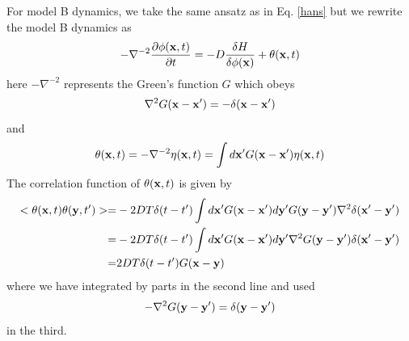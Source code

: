 For model B dynamics, we take the same ansatz as in Eq. \eqref{hans} but we rewrite the model B dynamics as
\begin{equation}
-\nabla^{-2} \frac{\partial\phi({\bf x},t)}{\partial t} = -D \frac{\delta H}{\delta \phi({\bf x})}+ \theta({\bf x},t)
\end{equation}
here $-\nabla^{-2}$ represents the Green's function $G$ which obeys 
\begin{equation}
\nabla^2 G({\bf x}-{\bf x'}) = -\delta({\bf x}-{\bf x}')
\end{equation}
and 
\begin{equation}
\theta({\bf x},t)=-\nabla^{-2}\eta({\bf x},t)= \int d{\bf x}'G({\bf x}-{\bf x'})\eta({\bf x},t)
\end{equation}
The correlation function of $\theta({\bf x},t)$ is given by
\begin{align}
< \theta({\bf x},t)\theta({\bf y},t')> =&-2DT\delta(t-t') \int d{\bf x}'G({\bf x}-{\bf x'})d{\bf y}'G({\bf y}-{\bf y'})\nabla^2\delta({\bf x}'-{\bf y}') \nonumber \\
=& -2DT\delta(t-t') \int d{\bf x}'G({\bf x}-{\bf x'})d{\bf y}'\nabla^2G({\bf y}-{\bf y'})\delta({\bf x}'-{\bf y}') \nonumber \\
=& 2DT\delta(t-t') G({\bf x}-{\bf y})
\end{align}
where we have integrated by parts in the second line and used 
\begin{equation}
-\nabla^2G({\bf y}-{\bf y'})= \delta({\bf y}-{\bf y}')
\end{equation}
in the third.

